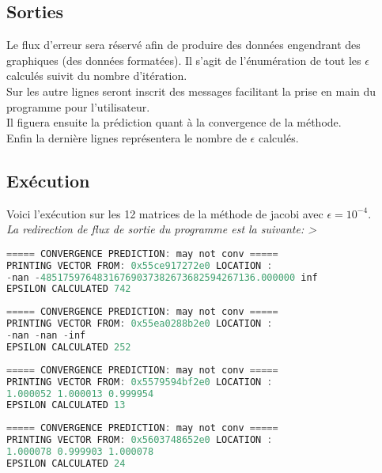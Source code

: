 \subsection{Sorties}
Le flux d'erreur sera réservé afin de produire des données engendrant des graphiques (des données formatées). Il s'agit de l'énumération de tout les $\epsilon$ calculés suivit du nombre d'itération. \\
Sur les autre lignes seront inscrit des messages facilitant la prise en main du programme pour l'utilisateur. \\
Il figuera ensuite la prédiction quant à la convergence de la méthode.\\
Enfin la dernière lignes représentera le nombre de $\epsilon$ calculés. \\
\subsection{Exécution}
Voici l'exécution sur les 12 matrices de la méthode de jacobi avec $\epsilon=10^{-4}$.\\
\textit{La redirection de flux de sortie du programme est la suivante: >}
\begin{lstlisting}[language=C,inputencoding=utf8, basicstyle=\fontsize{8}{10}\selectfont,caption=Execution with A1 matrix]
 ===== CONVERGENCE PREDICTION: may not conv =====
PRINTING VECTOR FROM: 0x55ce917272e0 LOCATION :
-nan -48517597648316769037382673682594267136.000000 inf
EPSILON CALCULATED 742
\end{lstlisting}
\begin{lstlisting}[language=C,inputencoding=utf8, basicstyle=\fontsize{8}{10}\selectfont,caption=Execution with A2 matrix]
 ===== CONVERGENCE PREDICTION: may not conv =====
PRINTING VECTOR FROM: 0x55ea0288b2e0 LOCATION :
-nan -nan -inf
EPSILON CALCULATED 252
\end{lstlisting}
\begin{lstlisting}[language=C,inputencoding=utf8, basicstyle=\fontsize{8}{10}\selectfont,caption=Execution with A3 matrix]
 ===== CONVERGENCE PREDICTION: may not conv =====
PRINTING VECTOR FROM: 0x5579594bf2e0 LOCATION :
1.000052 1.000013 0.999954
EPSILON CALCULATED 13
\end{lstlisting}
\begin{lstlisting}[language=C,inputencoding=utf8, basicstyle=\fontsize{8}{10}\selectfont,caption=Execution with A4 matrix]
 ===== CONVERGENCE PREDICTION: may not conv =====
PRINTING VECTOR FROM: 0x5603748652e0 LOCATION :
1.000078 0.999903 1.000078
EPSILON CALCULATED 24
\end{lstlisting}
